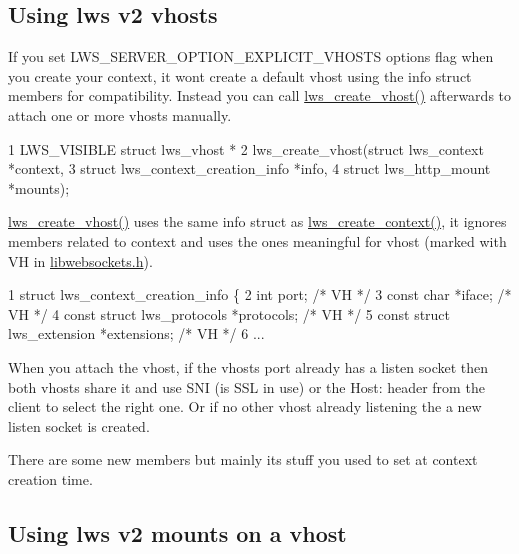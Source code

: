 \subsection*{Using lws v2 vhosts }

If you set L\+W\+S\+\_\+\+S\+E\+R\+V\+E\+R\+\_\+\+O\+P\+T\+I\+O\+N\+\_\+\+E\+X\+P\+L\+I\+C\+I\+T\+\_\+\+V\+H\+O\+S\+TS options flag when you create your context, it won\textquotesingle{}t create a default vhost using the info struct members for compatibility. Instead you can call \hyperlink{group__context-and-vhost_ga0c54c667ccd9b8b3dddcd123ca72f87c}{lws\+\_\+create\+\_\+vhost()} afterwards to attach one or more vhosts manually.


\begin{DoxyCode}
1 LWS\_VISIBLE struct lws\_vhost *
2 lws\_create\_vhost(struct lws\_context *context,
3                  struct lws\_context\_creation\_info *info,
4                  struct lws\_http\_mount *mounts);
\end{DoxyCode}


\hyperlink{group__context-and-vhost_ga0c54c667ccd9b8b3dddcd123ca72f87c}{lws\+\_\+create\+\_\+vhost()} uses the same info struct as \hyperlink{group__context-and-vhost_gaf2fff58562caab7510c41eeac85a8648}{lws\+\_\+create\+\_\+context()}, it ignores members related to context and uses the ones meaningful for vhost (marked with VH in \hyperlink{libwebsockets_8h}{libwebsockets.\+h}).


\begin{DoxyCode}
1 struct lws\_context\_creation\_info \{
2         int port;                                       /* VH */
3         const char *iface;                              /* VH */
4         const struct lws\_protocols *protocols;          /* VH */
5         const struct lws\_extension *extensions;         /* VH */
6 ...
\end{DoxyCode}


When you attach the vhost, if the vhost\textquotesingle{}s port already has a listen socket then both vhosts share it and use S\+NI (is S\+SL in use) or the Host\+: header from the client to select the right one. Or if no other vhost already listening the a new listen socket is created.

There are some new members but mainly it\textquotesingle{}s stuff you used to set at context creation time.

\subsection*{Using lws v2 mounts on a vhost }

